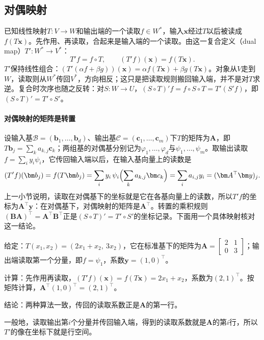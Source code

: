 \subsection{对偶映射}
\label{sec:ls-dual-map}

已知线性映射$T:V\to W$和输出端的一个读取$f\in W^*$，输入$\bm x$经过$T$以后被读成$f(T\bm x)$。先作用、再读取，合起来是输入端的一个读取。由这一复合定义（dual map）$T':W^*\to V^*$：
\begin{equation}
 T'f=f\circ T,\qquad (T'f)(\bm x)=f(T\bm x).
 \label{eq:ls-dual-map-def}
\end{equation}
$T'$保持线性组合：$(T'(\alpha f+\beta g))(\bm x)=\alpha f(T\bm x)+\beta g(T\bm x)$。对象从$V$走到$W$，读取则从$W^*$传回$V^*$，方向相反；这只是把读取规则搬回输入端，并不是对$T$求逆。复合时次序也随之反转：对$S:W\to U$，$(S\circ T)'f=f\circ S\circ T=T'(S'f)$，即$(S\circ T)'=T'\circ S'$。

\paragraph{对偶映射的矩阵是转置}
设输入基$\mathcal B=(\bm b_1,\ldots,\bm b_d)$、输出基$\mathcal C=(\bm c_1,\ldots,\bm c_m)$下$T$的矩阵为$\bm A$，即$T\bm b_j=\sum_ka_{k,j}\bm c_k$；两组基的对偶基分别记为$\varphi_1,\ldots,\varphi_d$与$\psi_1,\ldots,\psi_m$。取输出读取$f=\sum_iy_i\psi_i$，它传回输入端以后，在输入基向量上的读数是
\[
 (T'f)(\bm b_j)=f(T\bm b_j)
 =\sum_iy_i\,\psi_i\Bigl(\sum_ka_{k,j}\bm c_k\Bigr)
 =\sum_ia_{i,j}y_i=(\bm A^\top\bm y)_j .
\]
上一小节说明，读取在对偶基下的坐标就是它在各基向量上的读数，所以$T'f$的坐标为$\bm A^\top\bm y$：在对偶基下，对偶映射的矩阵是$\bm A^\top$。转置的乘积规则$(\bm B\bm A)^\top=\bm A^\top\bm B^\top$正是$(S\circ T)'=T'\circ S'$的坐标记录。下面用一个具体映射核对这一结论。
\begin{example}[把输出的第一个分量读取传回输入端]
\label{ex:ls-dual-map-first-component}
给定：$T(x_1,x_2)=(2x_1+x_2,\ 3x_2)$，它在标准基下的矩阵为$\bm A=\left[\begin{smallmatrix}2&1\\0&3\end{smallmatrix}\right]$；输出端读取第一个分量，即$f=\psi_1$，系数$\bm y=(1,0)^\top$。

计算：先作用再读取，$(T'f)(\bm x)=f(T\bm x)=2x_1+x_2$，系数为$(2,1)^\top$。按矩阵计算，$\bm A^\top(1,0)^\top=(2,1)^\top$。

结论：两种算法一致，传回的读取系数正是$\bm A$的第一行。
\end{example}
一般地，读取输出第$i$个分量并传回输入端，得到的读取系数就是$\bm A$的第$i$行，所以$T'$的像在坐标下就是行空间。

